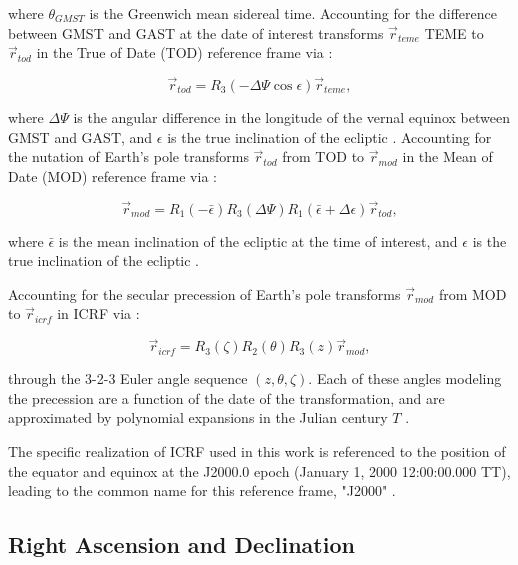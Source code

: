 where $\theta_{GMST}$ is the Greenwich mean sidereal time. Accounting for the difference between GMST and GAST at the date of interest transforms $\vec{r}_{teme}$ TEME to $\vec{r}_{tod}$ in the True of Date (TOD) reference frame via \cite{vallado4ed}:

\begin{equation} \label{eq:teme_to_tod}
  \vec{r}_{tod} = R_3(-\Delta \Psi \cos \epsilon) \vec{r}_{teme},
\end{equation}

where $\Delta \Psi$ is the angular difference in the longitude of the vernal equinox between GMST and GAST, and $\epsilon$ is the true inclination of the ecliptic \cite{vallado4ed}. Accounting for the nutation of Earth's pole transforms $\vec{r}_{tod}$ from TOD to $\vec{r}_{mod}$ in the Mean of Date (MOD) reference frame via \cite{vallado4ed}:

\begin{equation} \label{eq:tod_to_mod}
  \vec{r}_{mod} = R_1(-\bar{\epsilon}) R_3(\Delta\Psi) R_1(\bar{\epsilon} + \Delta\epsilon) \vec{r}_{tod},
\end{equation}

where $\bar{\epsilon}$ is the mean inclination of the ecliptic at the time of interest, and $\epsilon$ is the true inclination of the ecliptic \cite{vallado4ed}.

Accounting for the secular precession of Earth's pole transforms $\vec{r}_{mod}$ from MOD to $\vec{r}_{icrf}$ in ICRF via \cite{vallado4ed}:

\begin{equation} \label{eq:mod_to_icrf}
  \vec{r}_{icrf} = R_3(\zeta) R_2(\theta) R_3(z) \vec{r}_{mod},
\end{equation}

through the 3-2-3 Euler angle sequence $\left( z, \theta, \zeta \right)$. Each of these angles modeling the precession are a function of the date of the transformation, and are approximated by polynomial expansions in the Julian century $T$ \cite{frueh2019notes}.

The specific realization of ICRF used in this work is referenced to the position of the equator and equinox at the J2000.0 epoch (January 1, 2000 12:00:00.000 TT), leading to the common name for this reference frame, "J2000" \cite{vallado4ed}.

\subsection{Right Ascension and Declination}

